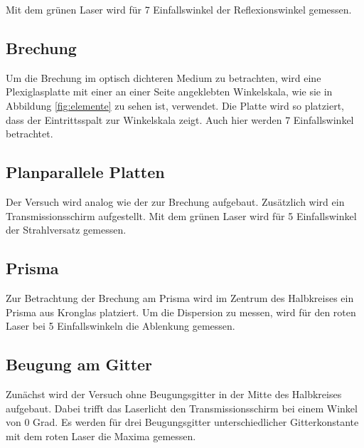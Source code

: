 Mit dem grünen Laser wird für 7 Einfallswinkel der Reflexionswinkel gemessen.

\subsection{Brechung}
Um die Brechung im optisch dichteren Medium zu betrachten, wird eine Plexiglasplatte
mit einer an einer Seite angeklebten Winkelskala,
wie sie in Abbildung \ref{fig:elemente} zu sehen ist, verwendet. Die 
Platte wird so platziert, dass der Eintrittsspalt zur Winkelskala zeigt.
Auch hier werden 7 Einfallswinkel betrachtet.

\subsection{Planparallele Platten}
Der Versuch wird analog wie der zur Brechung aufgebaut. Zusätzlich wird
ein Transmissionsschirm aufgestellt. Mit dem grünen Laser wird
für 5 Einfallswinkel der Strahlversatz gemessen.

\subsection{Prisma}
Zur Betrachtung der Brechung am Prisma wird im Zentrum des Halbkreises
ein Prisma aus Kronglas platziert. Um die Dispersion zu messen, wird
für den roten Laser bei 5 Einfallswinkeln die Ablenkung gemessen.

\subsection{Beugung am Gitter}
Zunächst wird der Versuch ohne Beugungsgitter in der Mitte des Halbkreises aufgebaut.
Dabei trifft das Laserlicht den Transmissionsschirm bei einem Winkel von 0 Grad. 
Es werden für drei Beugungsgitter unterschiedlicher Gitterkonstante mit dem roten Laser die 
Maxima gemessen. 